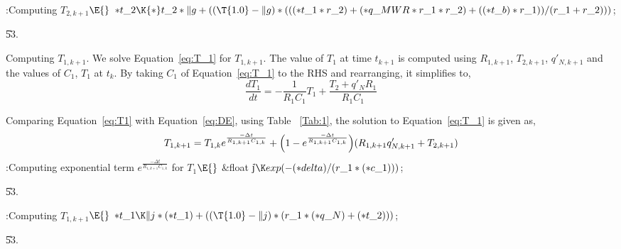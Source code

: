 \documentclass[letterpaper,12pt,baseclass=report]{cweb-hy}
\begin{document}
{
\Y\B\4:Computing $T_{2,k+1}$\X${}\E{}$\6
${*}\\{t\_2}\K{*}\\{t\_2}*\|g+((\T{1.0}-\|g)*((({*}\\{t\_1}*\\{r\_2})+({*}\\{q%
\_MWR}*\\{r\_1}*\\{r\_2})+(({*}\\{t\_b})*\\{r\_1}))/(\\{r\_1}+\\{r\_2}))){}$;%
\par
\U53.\fi

\fi

Computing ${T_{1,k+1}}$.
We solve Equation~\ref{eq:T_1} for ${T_{1,k+1}}$. The value of $T_1$ at time
$t_{k+1}$
is computed using
$R_{1,k+1}$, $T_{2,k+1}$, $q'_{N,k+1}$ and the values of  $C_1$, $T_1$ at
$t_{{k}}$.
By taking $C_1$ of Equation~\ref{eq:T_1} to the RHS and rearranging, it
simplifies to,
\begin{equation}
\frac{dT_{1}}{dt} =-\frac{1}{R_1 C_1 }T_1+\frac{T_2+q'_{N}R_1}{ R_1 C_1 } %
\label{eq:T1}
\end{equation}

Comparing Equation~\ref{eq:T1} with Equation~\ref{eq:DE}, using  Table~%
\ref{Tab:1},
the solution to Equation~\ref{eq:T_1} is given as,
\begin{equation}
T_{1,k+1}=T_{1,k}e^{\frac{-\Delta t}{R_{1,k+1} C_{1,k}}} +
\Bigl(1-e^{\frac{-\Delta t}{R_{1,k+1} C_{1,k}}}\Bigr) (R_{1,k+1}
q'_{N,k+1}+T_{2,k+1})
\end{equation}
\Y\B\4:Computing exponential term $e^{\frac{-\Delta t}{R_{1,k+1} C_{1,k}}}$
for $T_1$\X${}\E{}$\6
\&{float} \|j${}\K\\{exp}({-}({*}\\{delta})/(\\{r\_1}*({*}\\{c\_1}))){}$;\par
\U53.\fi

\Y\B\4:Computing $T_{1,k+1}$\X${}\E{}$\6
${*}\\{t\_1}\K\|j*({*}\\{t\_1})+((\T{1.0}-\|j)*(\\{r\_1}*({*}\\{q\_N})+({*}\\{t%
\_2}))){}$;\par
\U53.\fi

}
\end{document}

